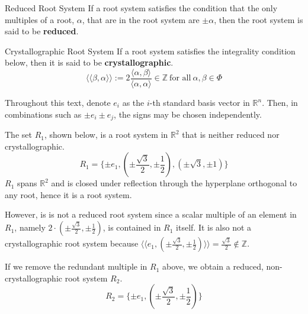 \begin{nameddefinition}{Reduced Root System}
    If a root system satisfies the condition that the only multiples of a root, $\alpha$, that are in the root system
    are $\pm \alpha$, then the root system is said to be \textbf{reduced}.
\end{nameddefinition}

\begin{nameddefinition}{Crystallographic Root System}
    If a root system satisfies the integrality condition below, then it is said to be \textbf{crystallographic}.
    \begin{equation*}
        \langle \langle \beta, \alpha \rangle \rangle := 2 \frac{ \langle \alpha, \beta \rangle}{\langle \alpha, \alpha \rangle}
        \in \mathbb{Z} \ \text{for all} \ \alpha, \beta \in \Phi
    \end{equation*}
\end{nameddefinition}

Throughout this text, denote $e_i$ as the $i$-th standard basis vector in $\mathbb{R}^n$.
Then, in combinations such as $\pm e_i \pm e_j$, the signs may be chosen independently.

\begin{example}
    The set $R_1$, shown below, is a root system in $\mathbb{R}^2$ that is neither reduced nor crystallographic.
    \begin{equation*}
        R_1 = \{
            \pm e_1, (\pm \frac{\sqrt{3}}{2}, \pm \frac{1}{2}), (\pm \sqrt{3}, \pm 1) 
        \} 
    \end{equation*}
    $R_1$ spans $\mathbb{R}^2$ and is closed under reflection through the hyperplane orthogonal to any root,
    hence it is a root system.
    
    However, is is not a reduced root system since a scalar multiple of an element in $R_1$,
    namely $2 \cdot (\pm \frac{\sqrt{3}}{2}, \pm \frac{1}{2})$, is contained in $R_1$ itself. 
    It is also not a crystallographic root system because 
    $\langle \langle e_1, (\pm \frac{\sqrt{3}}{2}, \pm \frac{1}{2}) \rangle \rangle = \frac{\sqrt{3}}{2} \notin \mathbb{Z}$.
\end{example}

\begin{example}
    If we remove the redundant multiple in $R_1$ above, we obtain a reduced, non-crystallographic root system $R_2$.
    \begin{equation*}
        R_2 = \{
            \pm e_1, (\pm \frac{\sqrt{3}}{2}, \pm \frac{1}{2})
        \} 
    \end{equation*}
\end{example}

